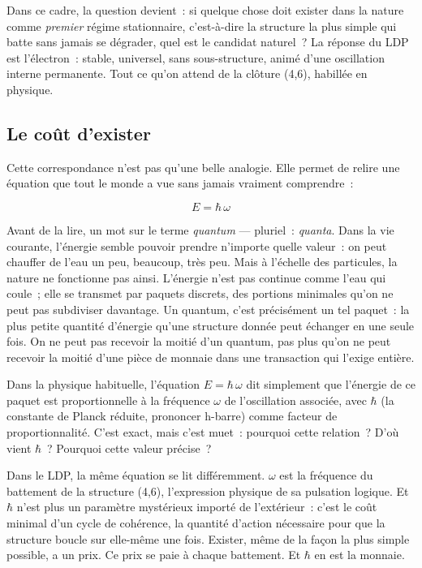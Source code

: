 \documentclass[12pt, a4paper, openright]{book}
\begin{document}
\medskip

Dans ce cadre, la question devient~: si quelque chose doit exister dans la nature comme \emph{premier} régime stationnaire, c'est-à-dire la structure la plus simple qui batte sans jamais se dégrader, quel est le candidat naturel~? La réponse du LDP est l'électron~: stable, universel, sans sous-structure, animé d'une oscillation interne permanente. Tout ce qu'on attend de la clôture (4,6), habillée en physique.

\subsection*{Le coût d'exister}

Cette correspondance n'est pas qu'une belle analogie. Elle permet de relire une équation que tout le monde a vue sans jamais vraiment comprendre~:

\begin{equation}
E = \hbar\,\omega
\end{equation}

Avant de la lire, un mot sur le terme \emph{quantum} — pluriel~: \emph{quanta}. Dans la vie courante, l'énergie semble pouvoir prendre n'importe quelle valeur~: on peut chauffer de l'eau un peu, beaucoup, très peu. Mais à l'échelle des particules, la nature ne fonctionne pas ainsi. L'énergie n'est pas continue comme l'eau qui coule~; elle se transmet par paquets discrets, des portions minimales qu'on ne peut pas subdiviser davantage. Un quantum, c'est précisément un tel paquet~: la plus petite quantité d'énergie qu'une structure donnée peut échanger en une seule fois. On ne peut pas recevoir la moitié d'un quantum, pas plus qu'on ne peut recevoir la moitié d'une pièce de monnaie dans une transaction qui l'exige entière.

\medskip

Dans la physique habituelle, l'équation $E = \hbar\,\omega$ dit simplement que l'énergie de ce paquet est proportionnelle à la fréquence $\omega$ de l'oscillation associée, avec $\hbar$ (la constante de Planck réduite, prononcer \og h-barre\fg{}) comme facteur de proportionnalité. C'est exact, mais c'est muet~: pourquoi cette relation~? D'où vient $\hbar$~? Pourquoi cette valeur précise~?

\medskip

Dans le LDP, la même équation se lit différemment. $\omega$ est la fréquence du battement de la structure (4,6), l'expression physique de sa pulsation logique. Et $\hbar$ n'est plus un paramètre mystérieux importé de l'extérieur~: c'est le coût minimal d'un cycle de cohérence, la quantité d'action nécessaire pour que la structure boucle sur elle-même une fois. Exister, même de la façon la plus simple possible, a un prix. Ce prix se paie à chaque battement. Et $\hbar$ en est la monnaie.
\end{document}
